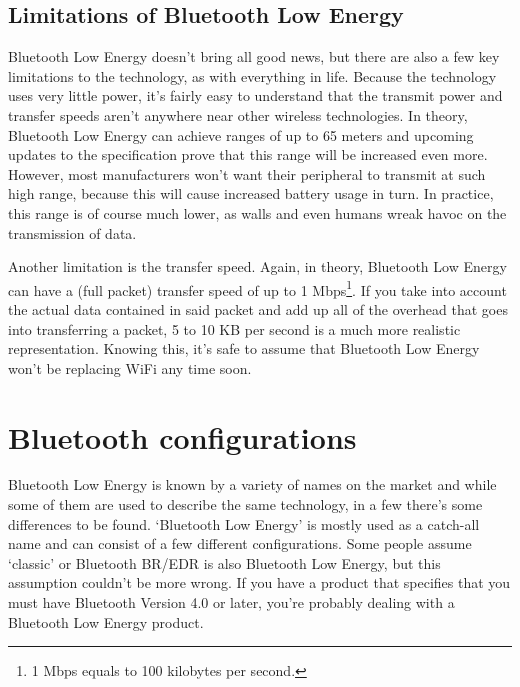 \documentclass[pdftex,a4paper,12pt,twoside]{report}
\begin{document}
\subsection{Limitations of Bluetooth Low Energy}
\label{subsec:limitations}
Bluetooth Low Energy doesn't bring all good news, but there are also a few key limitations to the technology, as with everything in life. Because the technology uses very little power, it's fairly easy to understand that the transmit power and transfer speeds aren't anywhere near other wireless technologies. In theory, Bluetooth Low Energy can achieve ranges of up to 65 meters and upcoming updates to the specification prove that this range will be increased even more. However, most manufacturers won't want their peripheral to transmit at such high range, because this will cause increased battery usage in turn. In practice, this range is of course much lower, as walls and even humans wreak havoc on the transmission of data.

Another limitation is the transfer speed. Again, in theory, Bluetooth Low Energy can have a (full packet) transfer speed of up to 1 Mbps\footnote{1 Mbps equals to 100 kilobytes per second.}. If you take into account the actual data contained in said packet and add up all of the overhead that goes into transferring a packet, 5 to 10 KB per second is a much more realistic representation. Knowing this, it's safe to assume that Bluetooth Low Energy won't be replacing WiFi any time soon.

\section{Bluetooth configurations}
\label{sec:bleconfigurations}
Bluetooth Low Energy is known by a variety of names on the market and while some of them are used to describe the same technology, in a few there's some differences to be found. `Bluetooth Low Energy' is mostly used as a catch-all name and can consist of a few different configurations. Some people assume `classic' or Bluetooth BR/EDR is also Bluetooth Low Energy, but this assumption couldn't be more wrong. If you have a product that specifies that you must have Bluetooth Version 4.0 or later, you're probably dealing with a Bluetooth Low Energy product.
\end{document}
